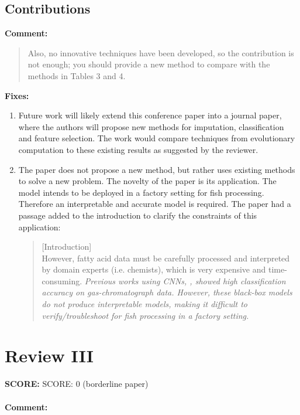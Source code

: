 \documentclass[runningheads]{llncs}
\begin{document}
\subsection{Contributions}

\textbf{Comment:}

\begin{quote}
  Also, no innovative techniques have been developed, so the contribution is not enough; you should provide a new method to compare with the methods in Tables 3 and 4.
\end{quote}

\noindent\textbf{Fixes:}

\begin{enumerate}
  \item Future work will likely extend this conference paper into a journal paper, where the authors will propose new methods for imputation, classification and feature selection. The work would compare techniques from evolutionary computation to these existing results as suggested by the reviewer.
  \item The paper does not propose a new method, but rather uses existing methods to solve a new problem. The novelty of the paper is its application. The model intends to be deployed in a factory setting for fish processing. Therefore an interpretable and accurate model is required. The paper had a passage added to the introduction to clarify the constraints of this application: 
  \begin{quote}
    [Introduction] \\ 
    However, fatty acid data must be carefully processed and interpreted by domain experts (i.e. chemists), which is very expensive and time-consuming.
    \emph{Previous works using CNNs, \cite{bi2020gc,matyushin2020gas}, showed high classification accuracy on gas-chromatograph data. 
    However, these black-box models do not produce interpretable models, making it difficult to verify/troubleshoot for fish processing in a factory setting.}
  \end{quote}
\end{enumerate}

\section{Review III}

\textbf{SCORE:} SCORE: 0 (borderline paper)
\\\\
\noindent\textbf{Comment:}
\end{document}
